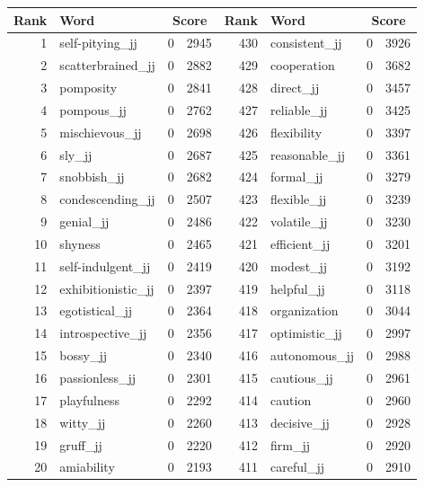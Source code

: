 \begin{table}[tbp]
    \begin{tabular}{| rlr@{.}l | rlr@{.}l |}
    \hline
    \textbf{Rank} & \textbf{Word} & \multicolumn{2}{c|}{\textbf{Score}} & \textbf{Rank} & \textbf{Word} & \multicolumn{2}{c|}{\textbf{Score}} \\
    \hline
    1 & self-pitying\_jj & 0 & 2945    &    430 & consistent\_jj & 0 & 3926 \\
    2 & scatterbrained\_jj & 0 & 2882    &    429 & cooperation & 0 & 3682 \\
    3 & pomposity & 0 & 2841    &    428 & direct\_jj & 0 & 3457 \\
    4 & pompous\_jj & 0 & 2762    &    427 & reliable\_jj & 0 & 3425 \\
    5 & mischievous\_jj & 0 & 2698    &    426 & flexibility & 0 & 3397 \\
    6 & sly\_jj & 0 & 2687    &    425 & reasonable\_jj & 0 & 3361 \\
    7 & snobbish\_jj & 0 & 2682    &    424 & formal\_jj & 0 & 3279 \\
    8 & condescending\_jj & 0 & 2507    &    423 & flexible\_jj & 0 & 3239 \\
    9 & genial\_jj & 0 & 2486    &    422 & volatile\_jj & 0 & 3230 \\
    10 & shyness & 0 & 2465    &    421 & efficient\_jj & 0 & 3201 \\
    11 & self-indulgent\_jj & 0 & 2419    &    420 & modest\_jj & 0 & 3192 \\
    12 & exhibitionistic\_jj & 0 & 2397    &    419 & helpful\_jj & 0 & 3118 \\
    13 & egotistical\_jj & 0 & 2364    &    418 & organization & 0 & 3044 \\
    14 & introspective\_jj & 0 & 2356    &    417 & optimistic\_jj & 0 & 2997 \\
    15 & bossy\_jj & 0 & 2340    &    416 & autonomous\_jj & 0 & 2988 \\
    16 & passionless\_jj & 0 & 2301    &    415 & cautious\_jj & 0 & 2961 \\
    17 & playfulness & 0 & 2292    &    414 & caution & 0 & 2960 \\
    18 & witty\_jj & 0 & 2260    &    413 & decisive\_jj & 0 & 2928 \\
    19 & gruff\_jj & 0 & 2220    &    412 & firm\_jj & 0 & 2920 \\
    20 & amiability & 0 & 2193    &    411 & careful\_jj & 0 & 2910 \\

\end{tabular}
\end{table}
